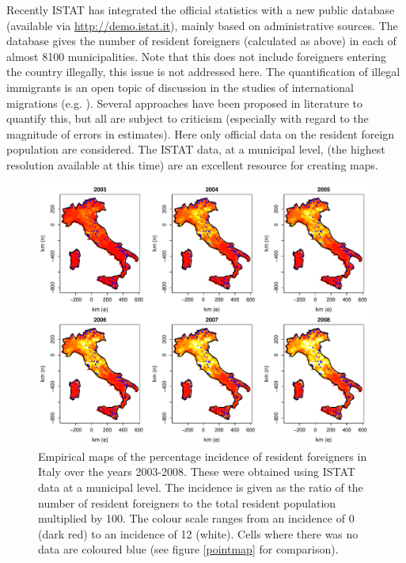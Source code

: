 Recently ISTAT has integrated the official statistics with a new public database (available via \url{http://demo.istat.it}), mainly based on administrative sources. The database gives the number of resident foreigners (calculated as above) in each of almost 8100 municipalities. Note that this does not include foreigners entering the country illegally, this issue is not addressed here. The quantification of illegal immigrants is an open topic of discussion in the studies of international migrations (e.g. \cite{Strozza2004}). Several approaches have been proposed in literature to quantify this, but all are subject to criticism (especially with regard to the magnitude of errors in estimates). Here only official data on the resident foreign population \label{cor-r1-2}are considered. The ISTAT data, at a municipal level, (the highest resolution available at this time) are an excellent resource for creating maps.

\begin{figure}[tbp]
	\centering
		\includegraphics[width=\textwidth]{it/regenraw/rawplot}
	\caption{Empirical maps of the percentage incidence of resident foreigners in Italy over the years 2003-2008. These were obtained using ISTAT data at a municipal level. The incidence is given as the ratio of the number of resident foreigners to the total resident population multiplied by 100. The colour scale ranges from an incidence of 0 (dark red) to an incidence of 12 (white). Cells where there was no data are coloured blue (see figure \ref{pointmap} for comparison). \label{cor-r19}}
	\label{Rd}
\end{figure}

